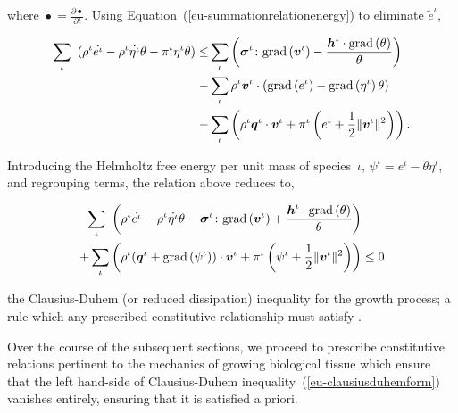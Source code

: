 \noindent where $\dot{\bullet}=\frac{\partial \bullet}{\partial
  t}$. Using Equation~(\ref{eu-summationrelationenergy}) to eliminate 
$\tilde{e}^{\iota}$,

\begin{equation*}
\begin{split}
\sum\limits_{\iota}\ \left(\rho^{\iota} \dot{e^{\iota}} -
\rho^{\iota} \dot{\eta^{\iota}} \theta 
 - \pi^{\iota}\eta^{\iota}\theta \right) \leq &
\sum\limits_{\iota} \left(
\mbox{\boldmath$\sigma$}^{\iota}\colon\mathrm{grad}\left(\mbox{\boldmath$ v$}^{\iota}\right)
- \frac{\mbox{\boldmath$ h$}^{\iota}\cdot\mathrm{grad}\left(\theta\right)}{\theta}
\right)\ \\ -& \sum\limits_{\iota}
\rho^{\iota}\mbox{\boldmath$ v$}^{\iota} \cdot\left(
\mathrm{grad} \left(e^{\iota}\right) - \mathrm{grad}\left(\eta^{\iota}
\right)\theta\right) \\ -& \sum\limits_{\iota} \left( \rho^{\iota}\mbox{\boldmath$ q$}^{\iota}\cdot\mbox{\boldmath$ v$}^{\iota} +
 \pi^{\iota} \left(e^\iota + \frac{1}{2} \Vert\mbox{\boldmath$ v$}^\iota\Vert^2\right) \right).
\end{split}
\end{equation*}

Introducing the Helmholtz free energy per unit mass of
species~$\iota$, \mbox{$\psi^\iota = e^\iota - \theta\eta^\iota$}, and
regrouping terms, the relation above reduces to,

\begin{equation}
\begin{split}
\sum\limits_{\iota}\ \bigg(\rho^{\iota} \dot{e^{\iota}} - \rho^{\iota}
\dot{\eta^{\iota}} \theta
-\mbox{\boldmath$\sigma$}^{\iota}\colon\mathrm{grad}\left(\mbox{\boldmath$ v$}^{\iota}\right) +
\frac{\mbox{\boldmath$ h$}^{\iota}\cdot\mathrm{grad}\left(\theta\right)}{\theta} \bigg)
& \\ + \sum\limits_{\iota} \left( \rho^{\iota}
(\mbox{\boldmath$ q$}^{\iota}+\mathrm{grad}\left(\psi^{\iota}\right)) \cdot\mbox{\boldmath$ v$}^{\iota}
+ \pi^{\iota} \left(\psi^{\iota}+\frac{1}{2}
\Vert\mbox{\boldmath$ v$}^\iota\Vert^2\right) \right) & \leq 0
\end{split}
\label{eu-clausiusduhemform}
\end{equation}

\noindent the Clausius-Duhem (or reduced dissipation) inequality for
the growth process; a rule which any prescribed constitutive
relationship must satisfy \citep{TruesdellToupin:60}.

Over the course of the subsequent sections, we proceed to prescribe
constitutive relations pertinent to the mechanics of growing
biological tissue which ensure that the left hand-side of
Clausius-Duhem inequality~(\ref{eu-clausiusduhemform}) vanishes
entirely, ensuring that it is satisfied a priori.


